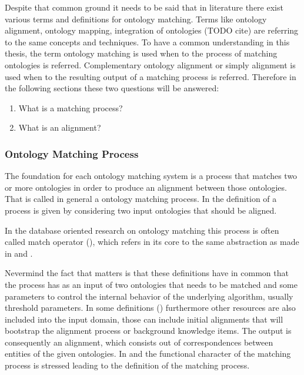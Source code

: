 \documentclass[11pt,titlepage,oneside,openany,a4paper]{report}
\begin{document}
	Despite that common ground it needs to be said that in literature there exist various terms and definitions for ontology matching. Terms like ontology alignment, ontology mapping, integration of ontologies (TODO cite) are referring to the same concepts and techniques. To have a common understanding in this thesis, the term ontology matching is used when to the process of matching ontologies is referred. Complementary ontology alignment or simply alignment is used when to the resulting output of a matching process is referred. Therefore in the following sections these two questions will be answered:
	
\begin{enumerate}
\item What is a matching process?
\item What is an alignment?
\end{enumerate}

\subsubsection{Ontology Matching Process}
\label{sec:om_process}
The foundation for each ontology matching system is a process that matches two or more ontologies in order to produce an alignment between those ontologies. That is called in general a ontology matching process. In the definition of a process is given by considering two input ontologies that should be aligned.

In the database oriented research on ontology matching this process is often called match operator (\cite{Rahm:2001}), which refers in its core to the same abstraction as made in \cite{euzenat2013d} and  \cite{ehrig2006ontology}.

Nevermind the fact that matters is that these definitions have in common that the process has as an input of two ontologies that needs to be matched and some parameters to control the internal behavior of the underlying algorithm, usually threshold parameters. In some definitions (\cite{euzenat2004api}) furthermore other resources are also included into the input domain, those can include initial alignments that will bootstrap the alignment process or background knowledge items. The output is consequently an alignment, which consists out of correspondences between entities of the given ontologies. In \cite{euzenat2013d} and  \cite{ehrig2006ontology} the functional character of the matching process is stressed leading to the definition of the matching process.
\end{document}
